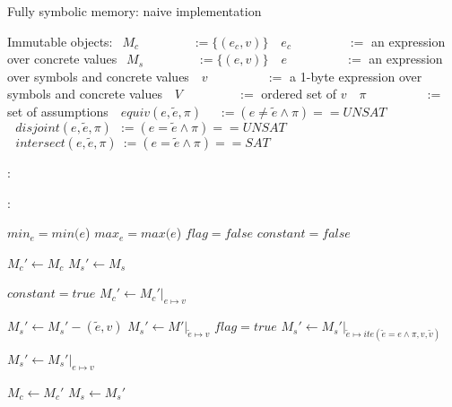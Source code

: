 \documentclass{article}
\begin{document}
\begin{algorithm}
  \normalsize

  \caption{Fully symbolic memory: naive implementation}
  \begin{algorithmic}
  	\State Immutable objects:
  	\State $~~M_c~~~~~~~~~~~~~~~~~~~:= \{(e_c,v)\}$ 
  	\State $~~~e_c~~~~~~~~~~~~~~~~~~~~:=$ an expression over concrete values
  	\State $~~M_s~~~~~~~~~~~~~~~~~~~:= \{(e,v)\}$ 
  	\State $~~~e~~~~~~~~~~~~~~~~~~~\,~:=$ an expression over symbols and concrete values
  	\State $~~~v~~~~~~~~~~~~~~~~~~~~\,:=$ a 1-byte expression over symbols and concrete values
  	\State $~~~V~~~~~~~~~~~~~~~~~~~\,:=$ ordered set of $v$
  	\State $~~~\pi~~~~~~~~~~~~~~~~~~~~\,:=$ set of assumptions
  	\State $~~~equiv(e, \widetilde{e}, \pi)~~~~~\,:= (e \not = \widetilde{e} \wedge \pi) == UNSAT$ 
  	\State $~~~disjoint(e, \widetilde{e}, \pi)~~:=  (e = \widetilde{e} \wedge \pi) == UNSAT$ 
  	\State $~~~intersect(e, \widetilde{e}, \pi)~:=  (e = \widetilde{e} \wedge \pi) == SAT$ 

  \end{algorithmic}

  \bigskip
  
  \begin{algorithmic}[1]
	:
			\State {}
		\EndFor
	\EndFunction
  \end{algorithmic}


  \bigskip

  \begin{algorithmic}[1]
	:
		
		\State $min_e = min(e$)
		\State $max_e = max(e$)
		\State $flag = false$
		\State $constant = false$

		\State ${M_c}' \leftarrow {M_c}$
	    \State ${M_s}' \leftarrow {M_s}$

			\State $constant = true$
			\State ${M_c}' \leftarrow {M_c}'\vert_{e \mapsto v}$
		\EndIf

					\State ${M_s}' \leftarrow {M_s}' - (\widetilde{e}, v)$
				\Else
	    			\State ${M_s}' \leftarrow M'\vert_{\widetilde{e} \mapsto v}$
	    		\EndIf
	    		\State $flag = true$
	    	\Else
	    		\State ${M_s}' \leftarrow {M_s}'\vert_{\widetilde{e} \mapsto ite(\widetilde{e} = e \wedge \pi, v, \widetilde{v})}$
	    	\EndIf
	    \EndFor

	    	\State ${M_s}' \leftarrow {M_s}'\vert_{e \mapsto v}$
	    \EndIf

	    \State ${M_c} \leftarrow {M_c}'$
	    \State ${M_s} \leftarrow {M_s}'$
	\EndFunction
  \end{algorithmic}

\end{algorithm}
  
\end{document}
